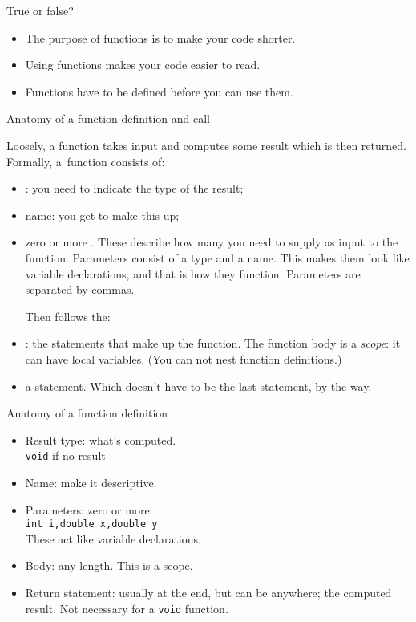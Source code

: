 \begin{review}
  \label{rev:func-why}
  True or false?
  \begin{itemize}
  \item The purpose of functions is to make your code shorter.
  \item Using functions makes your code easier to read.
  \item Functions have to be defined before you can use them.
  \end{itemize}
\end{review}

 {Anatomy of a function definition and call}

Loosely, a function takes input and computes some result which is then returned.
Formally, a~function consists of:
\begin{itemize}
\item {}: you need to indicate
  the type of the result;
\item name: you get to make this up;
\item zero or more . These describe
  how many  you need to supply as
  input to the function. Parameters consist of a type and a name. This
  makes them look like variable declarations, and that is how they
  function. Parameters are separated by commas.

  Then follows the:
\item {}: the statements that make up
  the function. The function body is a \emph{scope}: it can have local
  variables. (You can not nest function definitions.)
\item a  statement. Which doesn't have to be
  the last statement, by the way.
\end{itemize}

\begin{slide}{Anatomy of a function definition}
  \label{sl:func-anatomy}
  \begin{itemize}
  \item Result type: what's computed.\\ \lstinline{void} if no result
  \item Name: make it descriptive.
  \item Parameters: zero or more.\\
    \lstinline{int i,double x,double y}\\
    These act like variable declarations.
  \item Body: any length. This is a scope.
  \item Return statement: usually at the end, but can be anywhere; the
    computed result. Not necessary for a \lstinline{void} function.
  \end{itemize}
\end{slide}

